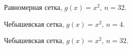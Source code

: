 \documentclass[12pt, a4paper]{article}
\begin{document}
\begin{figure}[h]
    \caption{Равномерная сетка, $g(x) = x^2$, $n = 32$.}
\end{figure}

\pagebreak


\begin{figure}[h]
    \caption{Чебышевская сетка, $g(x) = x^2$, $n = 4$.}
\end{figure}
\begin{figure}[h]
    \caption{Чебышевская сетка, $g(x) = x^2$, $n = 32$.}
\end{figure}
\pagebreak
\end{document}
